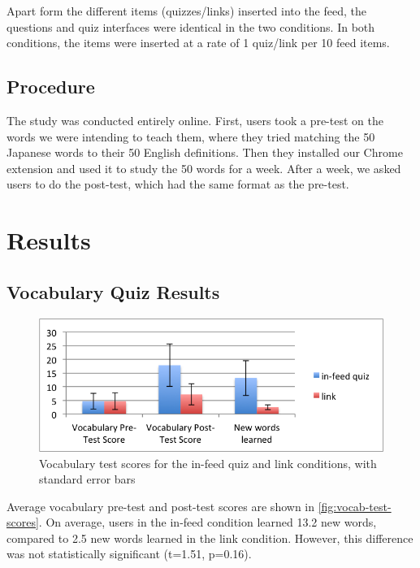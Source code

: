 \documentclass{sigchi}
\begin{document}
Apart form the different items (quizzes/links) inserted into the feed, the questions and quiz interfaces were identical in the two conditions. In both conditions, the items were inserted at a rate of 1 quiz/link per 10 feed items. %


\subsection{Procedure}

The study was conducted entirely online. First, users took a pre-test on the words we were intending to teach them, where they tried matching the 50 Japanese words to their 50 English definitions. Then they installed our Chrome extension and used it to study the 50 words for a week. After a week, we asked users to do the post-test, which had the same format as the pre-test.

\section{Results}

\subsection{Vocabulary Quiz Results}

\begin{figure}
\centering
\includegraphics[width=1.0\columnwidth]{vocab-test-scores}
\caption{Vocabulary test scores for the in-feed quiz and link conditions, with standard error bars}
\label{fig:vocab-test-scores}
\end{figure}

Average vocabulary pre-test and post-test scores are shown in \autoref{fig:vocab-test-scores}. On average, users in the in-feed condition learned 13.2 new words, compared to 2.5 new words learned in the link condition. However, this difference was not statistically significant (t=1.51, p=0.16).
\end{document}
